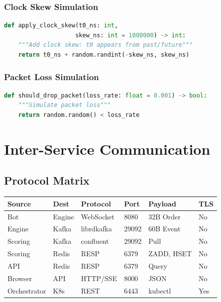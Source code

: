 \documentclass[10pt,a4paper,oneside]{report}
\begin{document}
\subsection{Clock Skew Simulation}

\begin{lstlisting}[language=python]
def apply_clock_skew(t0_ns: int,
                    skew_ns: int = 1000000) -> int:
    """Add clock skew: t0 appears from past/future"""
    return t0_ns + random.randint(-skew_ns, skew_ns)
\end{lstlisting}

\subsection{Packet Loss Simulation}

\begin{lstlisting}[language=python]
def should_drop_packet(loss_rate: float = 0.001) -> bool:
    """Simulate packet loss"""
    return random.random() < loss_rate
\end{lstlisting}

\chapter{Inter-Service Communication}

\section{Protocol Matrix}

\begin{table}[H]\tiny
    \centering
    \begin{tabular}{llllll}
    \toprule
    \textbf{Source} & \textbf{Dest} & \textbf{Protocol} & \textbf{Port} & \textbf{Payload} & \textbf{TLS} \\
    \midrule
    Bot & Engine & WebSocket & 8080 & 32B Order & No \\
    Engine & Kafka & librdkafka & 29092 & 60B Event & No \\
    Scoring & Kafka & confluent & 29092 & Pull & No \\
    Scoring & Redis & RESP & 6379 & ZADD, HSET & No \\
    API & Redis & RESP & 6379 & Query & No \\
    Browser & API & HTTP/SSE & 8000 & JSON & No \\
    Orchestrator & K8s & REST & 6443 & kubectl & Yes \\
    \bottomrule
    \end{tabular}
\end{table}
\end{document}
